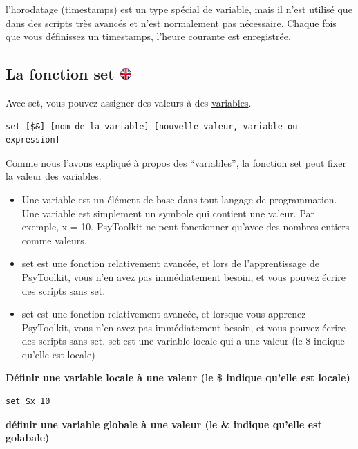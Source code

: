 \documentclass[
]{book}
\providecommand{\tightlist}{%
  \setlength{\itemsep}{0pt}\setlength{\parskip}{0pt}}
\begin{document}
l'horodatage (timestamps) est un type spécial de variable, mais il n'est utilisé que dans des scripts très avancés et n'est normalement pas nécessaire. Chaque fois que vous définissez un timestamps, l'heure courante est enregistrée.

\hypertarget{la-fonction-set}{%
\subsection[La fonction set ]{\texorpdfstring{La fonction set \href{https://www.psytoolkit.org/doc3.4.0/syntax.html\#task-set}{\protect\includegraphics{img/ukflag.png}}}{La fonction set }}\label{la-fonction-set}}

Avec set, vous pouvez assigner des valeurs à des \protect\hyperlink{variables-explained}{variables}.

\begin{verbatim}
set [$&] [nom de la variable] [nouvelle valeur, variable ou expression]
\end{verbatim}

Comme nous l'avons expliqué à propos des ``variables'', la fonction set peut fixer la valeur des variables.

\begin{itemize}
\tightlist
\item
  Une variable est un élément de base dans tout langage de programmation. Une variable est simplement un symbole qui contient une valeur. Par exemple, x = 10. PsyToolkit ne peut fonctionner qu'avec des nombres entiers comme valeurs.
\item
  set est une fonction relativement avancée, et lors de l'apprentissage de PsyToolkit, vous n'en avez pas immédiatement besoin, et vous pouvez écrire des scripts sans set.
\item
  set est une fonction relativement avancée, et lorsque vous apprenez PsyToolkit, vous n'en avez pas immédiatement besoin, et vous pouvez écrire des scripts sans set. set est une variable locale qui a une valeur (le \$ indique qu'elle est locale)
\end{itemize}

\textbf{Définir une variable locale à une valeur (le \$ indique qu'elle est locale)}

\begin{verbatim}
set $x 10
\end{verbatim}

\textbf{définir une variable globale à une valeur (le \& indique qu'elle est golabale)}
\end{document}

